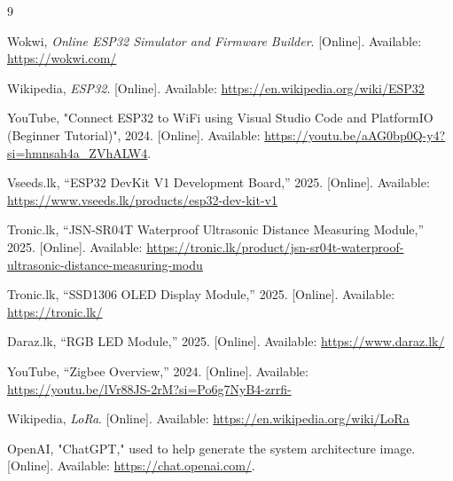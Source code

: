 \documentclass[12pt,a4paper]{report}
\begin{document}
\begin{thebibliography}{9}

Wokwi, \textit{Online ESP32 Simulator and Firmware Builder}. [Online]. Available: \url{https://wokwi.com/}

Wikipedia, \textit{ESP32}. [Online]. Available: \url{https://en.wikipedia.org/wiki/ESP32}

YouTube, "Connect ESP32 to WiFi using Visual Studio Code and PlatformIO (Beginner Tutorial)", 2024. [Online]. Available: \url{https://youtu.be/aAG0bp0Q-y4?si=hmnsah4a_ZVhALW4}.

Vseeds.lk, ``ESP32 DevKit V1 Development Board,'' 2025. [Online]. Available: \url{https://www.vseeds.lk/products/esp32-dev-kit-v1}

Tronic.lk, ``JSN-SR04T Waterproof Ultrasonic Distance Measuring Module,'' 2025. [Online]. Available: \url{https://tronic.lk/product/jsn-sr04t-waterproof-ultrasonic-distance-measuring-modu}

Tronic.lk, ``SSD1306 OLED Display Module,'' 2025. [Online]. Available: \url{https://tronic.lk/}

Daraz.lk, ``RGB LED Module,'' 2025. [Online]. Available: \url{https://www.daraz.lk/}
 
YouTube, ``Zigbee Overview,'' 2024. [Online]. Available: \url{https://youtu.be/lVr88JS-2rM?si=Po6g7NyB4-zrrfi-}

Wikipedia, \textit{LoRa}. [Online]. Available: \url{https://en.wikipedia.org/wiki/LoRa}

OpenAI, "ChatGPT," used to help generate the system architecture image. [Online]. Available: \url{https://chat.openai.com/}.

\end{thebibliography}
\end{document}
